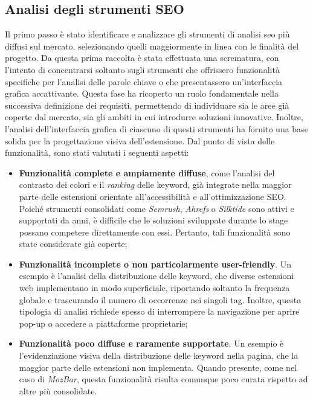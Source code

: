 \subsection{Analisi degli strumenti SEO}

\par Il primo passo è stato identificare e analizzare gli strumenti di analisi \gls{seo} più diffusi sul mercato, selezionando quelli maggiormente in linea con le finalità del progetto. Da questa prima raccolta è stata effettuata una scrematura, con l’intento di concentrarsi soltanto sugli strumenti che offrissero funzionalità specifiche per l’analisi delle parole chiave o che presentassero un’interfaccia grafica accattivante. Questa fase ha ricoperto un ruolo fondamentale nella successiva definizione dei requisiti, permettendo di individuare sia le aree già coperte dal mercato, sia gli ambiti in cui introdurre soluzioni innovative. Inoltre, l’analisi dell’interfaccia grafica di ciascuno di questi strumenti ha fornito una base solida per la progettazione visiva dell’estensione. Dal punto di vista delle funzionalità, sono stati valutati i seguenti aspetti:

\begin{itemize}
  \item \textbf{Funzionalità complete e ampiamente diffuse}, come l’analisi del contrasto dei colori e il \textit{ranking} delle keyword, già integrate nella maggior parte delle estensioni orientate all’accessibilità e all’ottimizzazione SEO. Poiché strumenti consolidati come \textit{Semrush}, \textit{Ahrefs} o \textit{Silktide} sono attivi e supportati da anni, è difficile che le soluzioni sviluppate durante lo stage possano competere direttamente con essi. Pertanto, tali funzionalità sono state considerate già coperte;
  \item \textbf{Funzionalità incomplete o non particolarmente user-friendly}. Un esempio è l’analisi della distribuzione delle keyword, che diverse estensioni web implementano in modo superficiale, riportando soltanto la frequenza globale e trascurando il numero di occorrenze nei singoli tag. Inoltre, questa tipologia di analisi richiede spesso di interrompere la navigazione per aprire pop-up o accedere a piattaforme proprietarie;
  \item \textbf{Funzionalità poco diffuse e raramente supportate}. Un esempio è l’evidenziazione visiva della distribuzione delle keyword nella pagina, che la maggior parte delle estensioni non implementa. Quando presente, come nel caso di \textit{MozBar}, questa funzionalità risulta comunque poco curata rispetto ad altre più consolidate.
\end{itemize}

